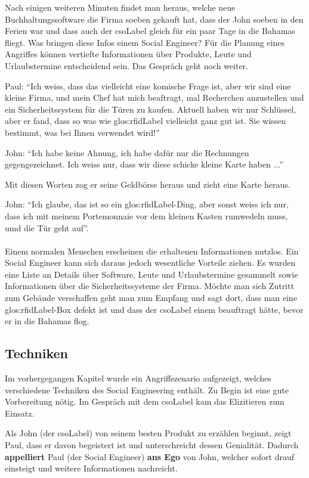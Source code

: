 Nach einigen weiteren Minuten findet man heraus, welche neue Buchhaltungssoftware die Firma soeben gekauft hat, dass der John soeben in den Ferien war und dass auch der \Gls{csoLabel} gleich für ein paar Tage in die Bahamas fliegt. Was bringen diese Infos einem Social Engineer? Für die Planung eines Angriffes können vertiefte Informationen über Produkte, Leute und Urlaubstermine entscheidend sein. Das Gespräch geht noch weiter.

Paul: "`Ich weiss, dass das vielleicht eine komische Frage ist, aber wir sind eine kleine Firma, und mein Chef hat mich beaftragt, mal Recherchen anzustellen und ein Sicherheitssystem für die Türen zu kaufen. Aktuell haben wir nur Schlüssel, aber er fand, dass so was wie \gls{glos:rfidLabel} vielleicht ganz gut ist. Sie wissen bestimmt, was bei Ihnen verwendet wird!"'

John: "`Ich habe keine Ahnung, ich habe dafür nur die Rechnungen gegengezeichnet. Ich weiss nur, dass wir diese schicke kleine Karte haben ..."'

Mit diesen Worten zog er seine Geldbörse heraus und zieht eine Karte heraus.

John: "`Ich glaube, das ist so ein \gls{glos:rfidLabel}-Ding, aber sonst weiss ich nur, dass ich mit meinem Portemonnaie vor dem kleinen Kasten rumwedeln muss, umd die Tür geht auf"'.
\\
\\
Einem normalen Menschen erscheinen die erhaltenen Informationen nutzlos. Ein Social Engineer kann sich daraus jedoch wesentliche Vorteile ziehen. Es wurden eine Liste an Details über Software, Leute und Urlaubstermine gesammelt sowie Informationen über die Sicherheitssysteme der Firma.
Möchte man sich Zutritt zum Gebäude verschaffen geht man zum Empfang und sagt dort, dass man eine \gls{glos:rfidLabel}-Box defekt ist und dass der \Gls{csoLabel} einem beauftragt hätte, bevor er in die Bahamas flog.

\subsection{Techniken}
Im vorhergegangen Kapitel wurde ein Angriffszenario aufgezeigt, welches verschiedene Techniken des Social Engineering enthält. Zu Begin ist eine gute Vorbereitung nötig. Im Gespräch mit dem \Gls{csoLabel} kam das Elizitieren zum Einsatz. 

Als John (der \Gls{csoLabel}) von seinem besten Produkt zu erzählen beginnt, zeigt Paul, dass er davon begeistert ist und unterschreicht dessen Genialität. Dadurch \textbf{appelliert} Paul (der Social Engineer) \textbf{ans Ego} von John, welcher sofort drauf einsteigt und weitere Informationen nachreicht.

